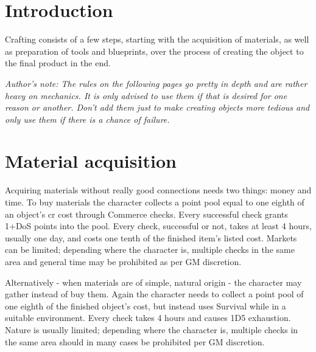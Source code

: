 \documentclass[12pt,a4paper,openany]{book}
\begin{document}
	

	\chapter{Introduction}
	Crafting consists of a few steps, starting with the acquisition of materials, as well as preparation of tools and blueprints, over the process of creating the object to the final product in the end.\par
	\vspace{5mm}
	\textit{Author's note: The rules on the following pages go pretty in depth and are rather heavy on mechanics. It is only advised to use them if that is desired for one reason or another. Don't add them just to make creating objects more tedious and only use them if there is a chance of failure.}

	\chapter{Material acquisition}
	Acquiring materials without really good connections needs two things: money and time. To buy materials the character collects a point pool equal to one eighth of an object’s cr cost through Commerce checks. Every successful check grants 1+DoS points into the pool. Every check, successful or not, takes at least 4 hours, usually one day, and costs one tenth of the finished item’s listed cost. Markets can be limited; depending where the character is, multiple checks in the same area and general time may be prohibited as per GM discretion. \par
	Alternatively - when materials are of simple, natural origin - the character may gather instead of buy them. Again the character needs to collect a point pool of one eighth of the finished object's cost, but instead uses Survival while in a suitable environment. Every check takes 4 hours and causes 1D5 exhaustion. Nature is usually limited; depending where the character is, multiple checks in the same area should in many cases be prohibited per GM discretion.
\end{document}
